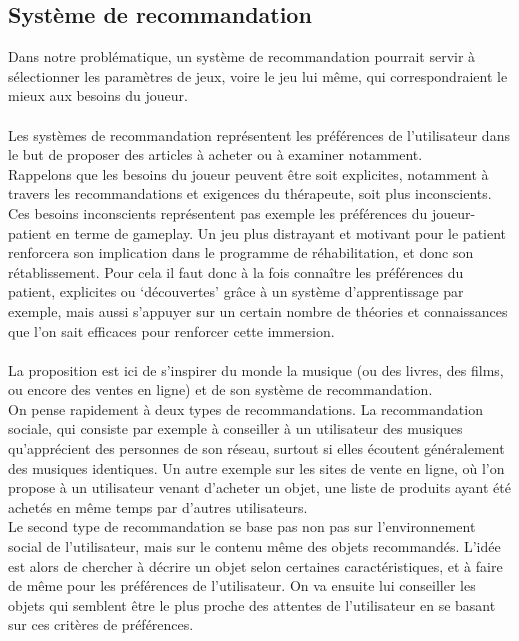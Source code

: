 	\subsection{Système de recommandation}	 \label{recommandation}
Dans notre problématique, un système de recommandation pourrait servir à sélectionner les paramètres de jeux, voire le jeu lui même, qui correspondraient le mieux aux besoins du joueur.

\paragraph{}
Les systèmes de recommandation représentent les préférences de l'utilisateur dans le but de proposer des articles à acheter ou à examiner notamment.\\
Rappelons que les besoins du joueur peuvent être soit explicites, notamment à travers les recommandations et exigences du thérapeute, soit plus inconscients. Ces besoins inconscients représentent pas exemple les préférences du joueur-patient en terme de gameplay. Un jeu plus distrayant et motivant pour le patient renforcera son implication dans le programme de réhabilitation, et donc son rétablissement. Pour cela il faut donc à la fois connaître les préférences du patient, explicites ou `découvertes'  grâce à un système d'apprentissage par exemple, mais aussi s'appuyer sur un certain nombre de théories et connaissances que l'on sait efficaces pour renforcer cette immersion. 	
	 
 \paragraph{}
 La proposition est ici de s'inspirer du monde la musique (ou des livres, des films, ou encore des ventes en ligne) et de son système de recommandation.\\
On pense rapidement à deux types de recommandations. La recommandation sociale, qui consiste par exemple à conseiller à un utilisateur des musiques qu'apprécient des personnes de son réseau, surtout si elles écoutent généralement des musiques identiques. Un autre exemple sur les sites de vente en ligne, où l'on propose à un utilisateur venant d'acheter un objet, une liste de produits ayant été achetés en même temps par d'autres utilisateurs. \\
Le second type de recommandation se base pas non pas sur l'environnement social de l'utilisateur, mais sur le contenu même des objets recommandés. L'idée est alors de chercher à décrire un objet selon certaines caractéristiques, et à faire de même pour les préférences de l'utilisateur. On va ensuite lui conseiller les objets qui semblent être le plus proche des attentes de l'utilisateur en se basant sur ces critères de préférences. 
 
